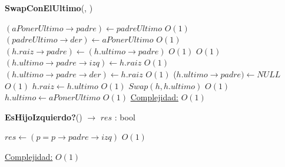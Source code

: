 \begin{Algoritmos}
\begin{algorithm}[H]{\textbf{SwapConElUltimo}(, )}
\begin{algorithmic}[1]
			 				\State $(aPonerUltimo \rightarrow padre) \gets padreUltimo$ \Comment $O(1)$
			 				\State $(padreUltimo \rightarrow der) \gets aPonerUltimo$ \Comment $O(1)$
			 				\EndIf
			 			\EndIf
			 		\EndIf
			 	\EndIf
			\Else
				\State $(h.raiz \rightarrow padre) \gets (h.ultimo \rightarrow padre)$ \Comment $O(1)$
				 \Comment $O(1)$
					\State $(h.ultimo \rightarrow padre \rightarrow izq) \gets h.raiz$ \Comment $O(1)$
				\Else
					\State $(h.ultimo \rightarrow padre \rightarrow der) \gets h.raiz$ \Comment $O(1)$
				\EndIf			
				\State ($h.ultimo \rightarrow padre) \gets NULL$ \Comment $O(1)$
				\State $h.raiz \gets h.ultimo$ \Comment $O(1)$
			\EndIf
	\Else
		\State $Swap(h, h.ultimo)$	\Comment $O(1)$
	\EndIf	
	\State $h.ultimo \gets aPonerUltimo$	\Comment $O(1)$
			\medskip
			\Statex \underline{Complejidad:} $O(1)$
    	\end{algorithmic}
\end{algorithm}

\begin{algorithm}[H]{\textbf{EsHijoIzquierdo?}() $\to$ $res$ : bool}
    	\begin{algorithmic}[1]
			 \State $res \gets  (p = p \rightarrow padre \rightarrow izq) $ \Comment $O(1)$

			\medskip
			\Statex \underline{Complejidad:} $O(1)$
    	\end{algorithmic}   	
\end{algorithm}


\end{Algoritmos}